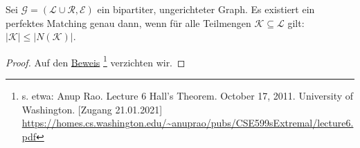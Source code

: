 \begin{satz}
Sei $\mathcal{G} = (\mathcal{L} \cup \mathcal{R}, \mathcal{E})$ ein bipartiter, ungerichteter Graph.
Es existiert ein perfektes Matching genau dann,
wenn für alle Teilmengen $\mathcal{K} \subseteq \mathcal{L}$ gilt: $|\mathcal{K}| \leqslant |N(\mathcal{K})|$.\textnormal{\cite[S.~736, Übung]{cormen:matchings}}
\end{satz}

\begin{proof}
Auf den
\href{https://homes.cs.washington.edu/~anuprao/pubs/CSE599sExtremal/lecture6.pdf}{Beweis}
\footnote{s. etwa: Anup Rao. Lecture 6 Hall’s Theorem. October 17, 2011. University of Washington. [Zugang 21.01.2021]\\
\url{https://homes.cs.washington.edu/~anuprao/pubs/CSE599sExtremal/lecture6.pdf}}
verzichten wir.
\end{proof}
